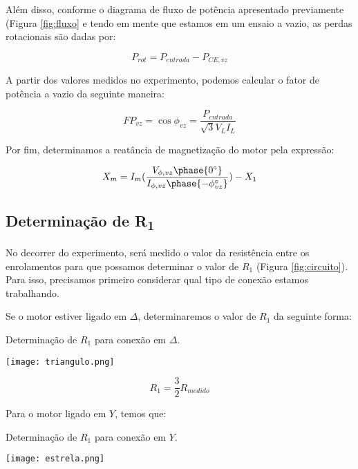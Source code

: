 \documentclass[a4paper,12pt,oneside]{article}
\begin{document}
Além disso, conforme o diagrama de fluxo de potência apresentado previamente (Figura \ref{fig:fluxo} e tendo em mente que estamos em um ensaio a vazio, as perdas rotacionais são dadas por:

\begin{equation}
P_{rot} = P_{entrada} - P_{CE,vz}
\end{equation}

A partir dos valores medidos no experimento, podemos calcular o fator de potência a vazio da seguinte maneira:

\begin{equation}
FP_{vz} = \cos \phi_{vz} = \frac{P_{entrada}}{\sqrt{3}V_L I_L}
\end{equation}

Por fim, determinamos a reatância de magnetização do motor pela expressão:

\begin{equation}
X_m = I_m (\frac{V_{\phi ,vz} \phase{0^\circ}}{I_{\phi ,vz} \phase{-\phi_{vz}^\circ}}) - X_1
\end{equation}

\subsection{Determinação de R\textsubscript{1}}\hspace{0pt}

No decorrer do experimento, será medido o valor da resistência entre os enrolamentos para que possamos determinar o valor de $R_1$ (Figura \ref{fig:circuito}). Para isso, precisamos primeiro considerar qual tipo de conexão estamos trabalhando. 

\newpage
Se o motor estiver ligado em $\Delta$, determinaremos o valor de $R_1$ da seguinte forma:

\begin{center}
\captionsetup{type=figure}
\caption{Determinação de $R_1$ para conexão em $\Delta$.}
\texttt{[image: triangulo.png]}\label{fig:triangulo}
\end{center}

\begin{equation}
R_1 = \frac{3}{2}R_{medido}
\end{equation}

Para o motor ligado em $Y$, temos que:

\begin{center}
\captionsetup{type=figure}
\caption{Determinação de $R_1$ para conexão em $Y$.}
\texttt{[image: estrela.png]}\label{fig:estrela}
\end{center}
\end{document}
